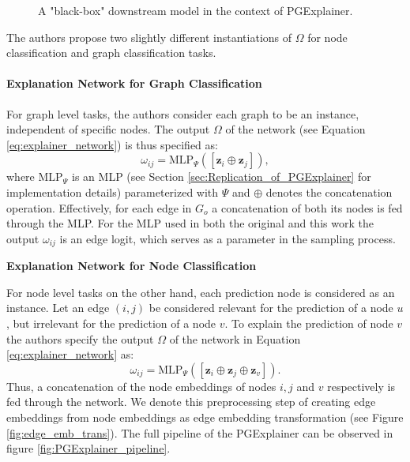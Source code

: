 \begin{figure}
\begin{tikzpicture}
    \end{tikzpicture}
    \caption["Black-box" downstream model in PGExplainer context.]{A "black-box" downstream model in the context of PGExplainer.}
    \label{fig:blackbox_downstream_model}
\end{figure}

The authors propose two slightly different instantiations of $\Omega$ for node classification and graph classification tasks.

\paragraph{Explanation Network for Graph Classification}\par
\label{par:explanation-network}
For graph level tasks, the authors consider each graph to be an instance, independent  of specific nodes. The output $\Omega$ of the network (see Equation \ref{eq:explainer_network}) is thus specified as:
\begin{equation}
    \label{eq:mlp_graph_input}
    \omega_{ij} = \text{MLP}_\Psi ([\mathbf{z}_i\oplus\mathbf{z}_j]),
\end{equation}
where $\text{MLP}_\Psi$ is an MLP (see Section \ref{sec:Replication_of_PGExplainer} for implementation details) parameterized with $\Psi$ and $\oplus$ denotes the concatenation operation. Effectively, for each edge in $G_o$ a concatenation of both its nodes is fed through the MLP. For the MLP used in both the original and this work the output $\omega_{ij}$ is an edge logit, which serves as a parameter in the sampling process. \bigskip

\textbf{Explanation Network for Node Classification}\par
For node level tasks on the other hand, each prediction node is considered as an instance. Let an edge $(i,j)$ be considered relevant for the prediction of a node $u$, but irrelevant for the prediction of a node $v$. To explain the prediction of node $v$ the authors specify the output $\Omega$ of the network in Equation \ref{eq:explainer_network} as:
\begin{equation}
    \omega_{ij} = \text{MLP}_\Psi ([\mathbf{z}_i\oplus\mathbf{z}_j\oplus\mathbf{z}_v]).
\end{equation}
Thus, a concatenation of the node embeddings of nodes $i, j$ and $v$ respectively is fed through the network. We denote this preprocessing step of creating edge embeddings from node embeddings as edge embedding transformation (see Figure \ref{fig:edge_emb_trans}). The full pipeline of the PGExplainer can be observed in figure \ref{fig:PGExplainer_pipeline}. \bigskip

